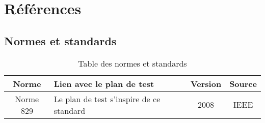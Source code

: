 
\chapter{Références}
	\section{Normes et standards}
\begin{table}[!h]
\begin{center}
\begin{tabular}{|c|p{}|c|c|}
\hline
\textbf{Norme} & \textbf{Lien avec le plan de test} & \textbf{Version} & \textbf{Source}\\
\hline
Norme 829 & Le plan de test s'inspire de ce standard & 2008 & IEEE\\
\hline
\end{tabular}
\end{center}
\caption{Table des normes et standards}
\end{table}